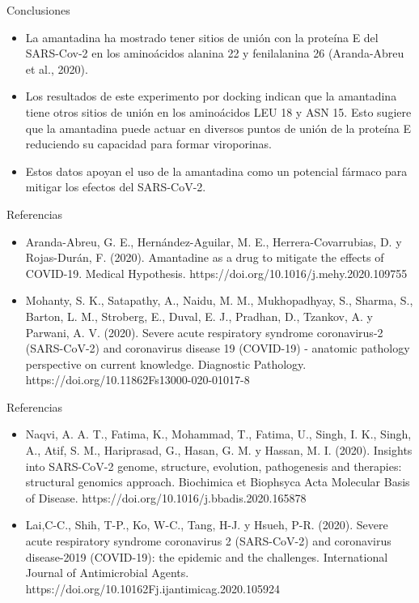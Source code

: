 \documentclass{beamer}
\begin{document}
\begin{frame}{Conclusiones}
\begin{itemize}
    \item La amantadina ha mostrado tener sitios de unión con la proteína E del SARS-Cov-2 en los aminoácidos alanina 22 y fenilalanina 26 (Aranda-Abreu et al., 2020).
    \item Los resultados de este experimento por docking indican que la amantadina tiene otros sitios de unión en los aminoácidos LEU 18 y ASN 15. Esto sugiere que la amantadina puede actuar en diversos puntos de unión de la proteína E reduciendo su capacidad para formar viroporinas.
    \item Estos datos apoyan el uso de la amantadina como un potencial fármaco para mitigar los efectos del SARS-CoV-2.
\end{itemize}

\end{frame}

\begin{frame}{Referencias}
\begin{itemize}
    \item Aranda-Abreu, G. E., Hernández-Aguilar, M. E., Herrera-Covarrubias, D. y Rojas-Durán, F. (2020). Amantadine as a drug to mitigate the effects of COVID-19. Medical Hypothesis. https://doi.org/10.1016/j.mehy.2020.109755
    
    \item Mohanty, S. K., Satapathy, A., Naidu, M. M., Mukhopadhyay, S., Sharma, S., Barton, L. M., Stroberg, E., Duval, E. J., Pradhan, D., Tzankov, A. y Parwani, A. V. (2020). Severe acute respiratory syndrome coronavirus-2 (SARS-CoV-2) and coronavirus disease 19 (COVID-19) - anatomic pathology perspective on current knowledge. Diagnostic Pathology.
https://doi.org/10.11862Fs13000-020-01017-8
\end{itemize}

\end{frame}

\begin{frame}{Referencias}
    
\begin{itemize}
\item Naqvi, A. A. T., Fatima, K., Mohammad, T., Fatima, U., Singh, I. K., Singh, A., Atif, S. M., Hariprasad, G., Hasan, G. M. y Hassan, M. I. (2020). Insights into SARS-CoV-2 genome, structure, evolution, pathogenesis and therapies: structural genomics approach. Biochimica et Biophsyca Acta Molecular Basis of Disease. https://doi.org/10.1016/j.bbadis.2020.165878

\item Lai,C-C., Shih, T-P., Ko, W-C., Tang, H-J. y Hsueh, P-R. (2020). 
Severe acute respiratory syndrome coronavirus 2 (SARS-CoV-2) and coronavirus disease-2019 (COVID-19): the epidemic and the challenges. 
International Journal of Antimicrobial Agents.
https://doi.org/10.10162Fj.ijantimicag.2020.105924
    
\end{itemize}
\end{frame}
\end{document}
